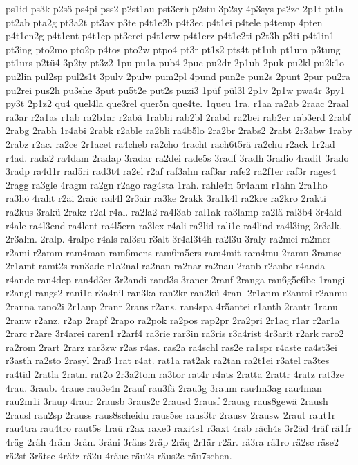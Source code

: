 {ps1id
ps3k
p2sö
ps4pi
pss2
p2st1au
pst3erh
p2stu
3p2sy
4p3sys
ps2ze
2p1t
pt1a
pt2ab
pta2g
pt3a2t
pt3ax
p3te
p4t1e2b
p4t3ec
p4t1ei
p4tele
p4temp
4pten
p4t1en2g
p4t1ent
p4t1ep
pt3erei
p4t1erw
p4t1erz
p4t1e2ti
p2t3h
p3ti
p4t1in1
pt3ing
pto2mo
pto2p
p4tos
pto2w
ptpo4
pt3r
pt1s2
pts4t
pt1uh
pt1um
p3tung
pt1urs
p2tü4
3p2ty
pt3z2
1pu
pu1a
pub4
2puc
pu2dr
2p1uh
2puk
pu2kl
pu2k1o
pu2lin
pul2sp
pul2s1t
3pulv
2pulw
pum2pl
4pund
pun2e
pun2s
2punt
2pur
pu2ra
pu2rei
pus2h
pu3she
3put
pu5t2e
put2s
puzi3
1püf
pül3l
2p1v
2p1w
pwa4r
3py1
py3t
2p1z2
qu4
quel4la
que3rel
quer5n
que4te.
1queu
1ra.
r1aa
ra2ab
2raac
2raal
ra3ar
r2a1as
r1ab
ra2b1ar
r2abä
1rabbi
rab2bl
2rabd
ra2bei
rab2er
rab3erd
2rabf
2rabg
2rabh
1r4abi
2rabk
r2able
ra2bli
ra4b5lo
2ra2br
2rabs2
2rabt
2r3abw
1raby
2rabz
r2ac.
ra2ce
2r1acet
ra4cheb
ra2cho
4racht
rach6t5rä
ra2chu
r2ack
1r2ad
r4ad.
rada2
ra4dam
2radap
3radar
ra2dei
rade5s
3radf
3radh
3radio
4radit
3rado
3radp
ra4d1r
rad5ri
rad3t4
ra2el
r2af
raf3ahn
raf3ar
rafe2
ra2f1er
raf3r
rages4
2ragg
ra3gle
4ragm
ra2gn
r2ago
rag4sta
1rah.
rahle4n
5r4ahm
r1ahn
2ra1ho
ra3hö
4raht
r2ai
2raic
rail4l
2r3air
ra3ke
2rakk
3ra1k4l
ra2kre
ra2kro
2rakti
ra2kus
3rakü
2rakz
r2al
r4al.
ra2la2
ra4l3ab
ral1ak
ra3lamp
ra2lä
ral3b4
3r4ald
r4ale
ra4l3end
ra4lent
ra4l5ern
ra3lex
r4ali
ra2lid
rali1e
ra4lind
ra4l3ing
2r3alk.
2r3alm.
2ralp.
4ralpe
r4als
ral3su
r3alt
3r4al3t4h
ra2l3u
3raly
ra2mei
ra2mer
r2ami
r2amm
ram4man
ram6mens
ram6m5ers
ram4mit
ram4mu
2ramn
3ramsc
2r1amt
ramt2s
ran3ade
r1a2nal
ra2nan
ra2nar
ra2nau
2ranb
r2anbe
r4anda
r4ande
ran4dep
ran4d3er
3r2andi
rand3s
3raner
2ranf
2ranga
ran6g5e6be
1rangi
r2angl
rangs2
rani1e
r3a4nil
ran3ka
ran2kr
ran2kü
4ranl
2r1anm
r2anmi
r2anmu
2ranna
rano2i
2r1anp
2ranr
2rans
r2ans.
ran4spa
4r5antei
r1anth
2rantr
1ranu
2ranw
r2anz.
r2ap
2rapf
2rapo
ra2pok
ra2pos
rap2pr
2ra2pri
2r1aq
r1ar
r2ar1a
2rarc
r2are
3r4arei
raren1
r2arf4
ra3rie
rar3in
ra3ris
r3a4rist
4r3arit
r2ark
raro2
ra2rom
2rart
2rarz
rar3zw
r2as
r4as.
ras2a
ra4schl
ras2e
ra1spr
r4aste
ra4st3ei
r3asth
ra2sto
2rasyl
2raß
1rat
r4at.
rat1a
rat2ak
ra2tan
ra2t1ei
r3atel
ra3tes
ra4tid
2ratla
2ratm
rat2o
2r3a2tom
ra3tor
rat4r
r4ats
2ratta
2rattr
4ratz
rat3ze
4rau.
3raub.
4raue
rau3e4n
2rauf
rau3fä
2rau3g
3raum
rau4m3ag
rau4man
rau2m1i
3raup
4raur
2rausb
3raus2c
2rausd
2rausf
2rausg
raus8gewä
2raush
2rausl
rau2sp
2rauss
raus8scheidu
raus5se
raus3tr
2rausv
2rausw
2raut
raut1r
rau4tra
rau4tro
raut5s
1raü
r2ax
raxe3
raxi4s1
r3axt
4räb
räch4s
3r2äd
4räf
rä1fr
4räg
2räh
4räm
3rän.
3räni
3räns
2räp
2räq
2r1är
r2är.
rä3ra
rä1ro
rä2sc
räse2
rä2st
3rätse
4rätz
rä2u
4räue
räu2s
räus2c
räu7schen.
}
